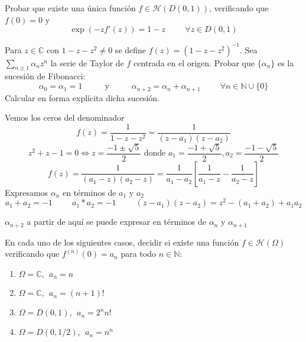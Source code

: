 \begin{ejer}
	Probar que existe una única función $f\in\mathcal{H}(D(0,1))$, verificando que $f(0)=0$ y 
	$$ \exp(-zf'(z)) = 1-z \hspace{1cm} \forall z\in D(0,1) $$
\end{ejer}



\begin{ejer}
	Para $z\in\mathbb{C}$ con $1-z-z^2\not =0$ se define $f(z) = (1-z-z^2)^{-1}$. Sea $\sum_{n\geq 1}\alpha_nz^n$ la serie de Taylor de $f$ centrada en el origen. Probar que $\{\alpha_n \}$ es la sucesión de Fibonacci:
	$$ \alpha_0 = \alpha_{1} = 1 \hspace{1cm}\text{ y }\hspace{1cm} \alpha_{n+2} = \alpha_n + \alpha_{n+1} \hspace{1cm}\forall n\in\mathbb{N}\cup\{0\}  $$
	Calcular en forma explícita dicha sucesión.
\end{ejer}
\begin{sol}
	Vemos los ceros del denominador
	$$f(z) = \frac{1}{1-z-z^2} = \frac{1}{(z-a_1)(z-a_2)} $$
	$$z^2+z-1 = 0 \Longleftrightarrow z = \frac{-1\pm \sqrt{5}}{2} \text{\ \ donde \ \ } a_1=\frac{-1+ \sqrt{5}}{2},a_2=\frac{-1- \sqrt{5}}{2}$$
	$$f(z) = \frac{1}{(a_1-z)(a_2-z)} = \frac{1}{a_1-a_2}\left[ \frac{1}{a_1-z}-\frac{1}{a_2-z} \right]$$
	Expresamos $\alpha_n$ en términos de $a_1$ y $a_2$
	$$a_1+a_2 = -1 \hspace{1cm}a_1*a_2=-1 \hspace{1cm}(z-a_1)(z-a_2) = z^2-(a_1+a_2) + a_1a_2$$
	
	$\alpha_{n+2}$ a partir de aquí se puede expresar en términos de $\alpha_n$ y $\alpha_{n+1}$
\end{sol}


\begin{ejer}
	En cada uno de los siguientes casos, decidir si existe una función $f\in\mathcal{H}(\Omega)$ verificando que $f^{(n)}(0)=a_n$ para todo $n\in\mathbb{N}$:
	\begin{enumerate}[label=(\alph*)]
		\item $\Omega = \mathbb{C}, \ \ a_n=n$
		\item $\Omega=\mathbb{C},\ \ a_n=(n+1)!$
		\item $\Omega=D(0,1), \ \ a_n=2^nn!$
		\item $\Omega=D(0,1/2), \ \ a_n=n^n$
	\end{enumerate}
\end{ejer}

